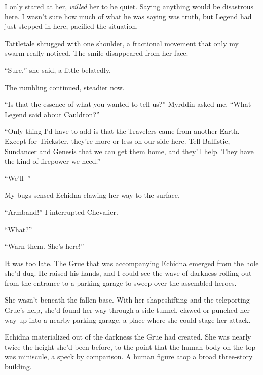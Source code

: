 I only stared at her, \emph{willed} her to be quiet.  Saying anything would be disastrous here.  I wasn't sure how much of what he was saying was truth, but Legend had just stepped in here, pacified the situation.



Tattletale shrugged with one shoulder, a fractional movement that only my swarm really noticed.  The smile disappeared from her face.



``Sure,'' she said, a little belatedly.



The rumbling continued, steadier now.



``Is that the essence of what you wanted to tell us?'' Myrddin asked me.  ``What Legend said about Cauldron?''



``Only thing I'd have to add is that the Travelers came from another Earth.  Except for Trickster, they're more or less on our side here.  Tell Ballistic, Sundancer and Genesis that we can get them home, and they'll help.  They have the kind of firepower we need.''



``We'll--''



My bugs sensed Echidna clawing her way to the surface.



``Armband!''  I interrupted Chevalier.



``What?''



``Warn them.  She's here!''



It was too late.  The Grue that was accompanying Echidna emerged from the hole she'd dug.  He raised his hands, and I could see the wave of darkness rolling out from the entrance to a parking garage to sweep over the assembled heroes.



She wasn't beneath the fallen base.  With her shapeshifting and the teleporting Grue's help, she'd found her way through a side tunnel, clawed or punched her way up into a nearby parking garage, a place where she could stage her attack.



Echidna materialized out of the darkness the Grue had created.  She was nearly twice the height she'd been before, to the point that the human body on the top was miniscule, a speck by comparison.  A human figure atop a broad three-story building.



